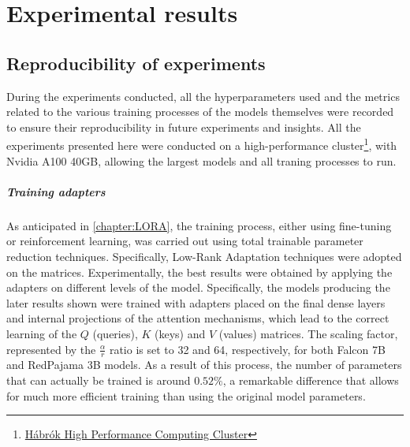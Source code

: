 

\chapter{Experimental results}

\section{Reproducibility of experiments} During the experiments conducted, all the hyperparameters used and the metrics related to the various training processes of the models themselves were recorded to ensure their reproducibility in future experiments and insights. All the experiments presented here were conducted on a high-performance cluster\footnote{\href{https://www.rug.nl/society-business/centre-for-information-technology/research/services/hpc/facilities/peregrine-hpc-cluster}{Hábrók High Performance Computing Cluster}}, with Nvidia A100 40GB, allowing the largest models and all traning processes to run.

\paragraph{Training adapters} As anticipated in \ref{chapter:LORA}, the training process, either using fine-tuning or reinforcement learning, was carried out using total trainable parameter reduction techniques. Specifically, Low-Rank Adaptation techniques were adopted on the matrices. Experimentally, the best results were obtained by applying the adapters on different levels of the model. Specifically, the models producing the later results shown were trained with adapters placed on the final dense layers and internal projections of the attention mechanisms, which lead to the correct learning of the $Q$ (queries), $K$ (keys) and $V$ (values) matrices. The scaling factor, represented by the $\frac{\alpha}{r}$ ratio is set to 32 and 64, respectively, for both Falcon 7B and RedPajama 3B models.
As a result of this process, the number of parameters that can actually be trained is around $0.52\%$, a remarkable difference that allows for much more efficient training than using the original model parameters.


